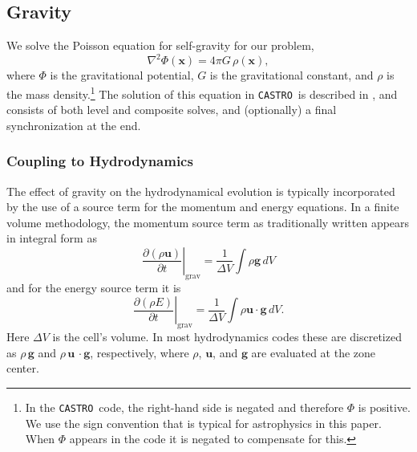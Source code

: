 \documentclass[iop]{../emulateapj}
\newcommand{\castro}{\texttt{CASTRO}}
\begin{document}
\subsection{Gravity}
\label{sec:gravity}

We solve the Poisson equation for self-gravity for our problem,
\begin{equation}
  \nabla^2 \Phi(\mathbf{x}) = 4\pi G\, \rho(\mathbf{x}),
\end{equation}
where $\Phi$ is the gravitational potential, $G$ is the gravitational
constant, and $\rho$ is the mass density.\footnote{In the \castro\ code, the 
right-hand side is negated and therefore $\Phi$ is positive. We use the 
sign convention that is typical for astrophysics in this paper. 
When $\Phi$ appears in the code it is negated to compensate for this.} 
The solution of this equation in \castro\ is described in \cite{castro}, and
consists of both level and composite solves, and (optionally) a final
synchronization at the end.

\subsubsection{Coupling to Hydrodynamics}\label{sec:gravity_hydro_coupling}

The effect of gravity on the hydrodynamical evolution is typically
incorporated by the use of a source term for the momentum and energy
equations. In a finite volume methodology, the momentum source term 
as traditionally written appears in integral form as
\begin{equation}
  \left.\frac{\partial (\rho \mathbf{u})}{\partial t}\right|_{\text{grav}} = \frac{1}{\Delta V} \int \rho \mathbf{g}\, dV
\end{equation}
and for the energy source term it is
\begin{equation}
  \left.\frac{\partial (\rho E)}{\partial t}\right|_{\text{grav}} = \frac{1}{\Delta V} \int \rho \mathbf{u}\cdot\mathbf{g}\, dV \label{eq:cell_center_gravity_source}.
\end{equation}
Here $\Delta V$ is the cell's volume.
In most hydrodynamics codes these are discretized as $\rho\,
\mathbf{g}$ and $\rho\, \mathbf{u}\,\cdot\mathbf{g}$, respectively, 
where $\rho$, $\mathbf{u}$, and $\mathbf{g}$ 
are evaluated at the zone center. 
\end{document}
